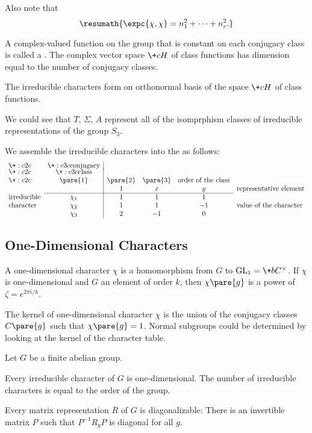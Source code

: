 \documentclass[hidelinks]{article}
\DeclareMathOperator{\GL}{GL}
\let\oldgloss\gloss
\def\gloss#1{\textnormal{\textbf{\oldgloss{#1}}}}
\begin{document}
Also note that
\[ \resumath{\expc{\chi,\chi} = n_1^2 + \cdots + n_r^2.} \]
\par
A complex-valued function on the group that is constant on each conjugacy class is called a . The complex vector space $\+cH$ of class functions has dimension equal to the number of conjugacy classes.
\begin{corollary}
    The irreducible characters form on orthonormal basis of the space $\+cH$ of class functions.
\end{corollary}
We could see that $T$, $\Sigma$, $A$ represent all of the isomprphism classes of irreducible representations of the group $S_3$.
\par
We assemble the irreducible characters into the  as follows:
\[ \begin{array}{lc|cccl}
    \+:c2{c}{} & \+:c3{c}{\text{conjugacy}} \\[-.3em]
    \+:c2{c}{} & \+:c3{c}{\text{class}} \\
    \+:c2{c}{} & \pare{1} & \pare{2} & \pare{3} & \text{order of the class} \\
    & & 1 & x & y & \text{representative element} \\
    \cline{2-5}
    \text{irreducible} & \chi_1 & 1 & 1 & 1 \\
    \text{character} & \chi_2 & 1 & 1 & -1 & \text{value of the character} \\
    & \chi_3 & 2 & -1 & 0
\end{array} \]


\subsection{One-Dimensional Characters} %
\label{sub:one_dimensional_characters}

A one-dimensional character $\chi$ is a homomorphism from $G$ to $\GL_1 = \+bC^\times$. If $\chi$ is one-dimensional and $G$ an element of order $k$, then $\chi\pare{g}$ is a power of $\zeta = e^{2\pi i/k}$.
\par
The kernel of one-dimensional character $\chi$ is the union of the conjugacy classes $C\pare{g}$ such that $\chi\pare{g} = 1$. Normal subgroups could be determined by looking at the kernel of the character table.
\begin{theorem}
    Let $G$ be a finite abelian group.
    \begin{cenum}
        \item Every irreducible character of $G$ is one-dimensional. The number of irreducible characters is equal to the order of the group.
        \item Every matrix representation $R$ of $G$ is diagonalizable: There is an invertible matrix $P$ such that $P^{-1}R_g P$ is diagonal for all $g$.
    \end{cenum}
\end{theorem}
\end{document}
